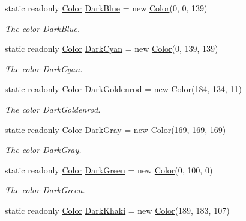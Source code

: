 \begin{DoxyCompactItemize}
static readonly \hyperlink{struct_tri_devs_1_1_tri_engine2_d_1_1_color}{Color} \hyperlink{struct_tri_devs_1_1_tri_engine2_d_1_1_color_af347b38273428c1441418a59a7eda9c7}{Dark\-Blue} = new \hyperlink{struct_tri_devs_1_1_tri_engine2_d_1_1_color}{Color}(0, 0, 139)
\begin{DoxyCompactList}\small\item\em The color Dark\-Blue. \end{DoxyCompactList}\item 
static readonly \hyperlink{struct_tri_devs_1_1_tri_engine2_d_1_1_color}{Color} \hyperlink{struct_tri_devs_1_1_tri_engine2_d_1_1_color_a972ef3b358f0a0bb1f18b26cc158bb0f}{Dark\-Cyan} = new \hyperlink{struct_tri_devs_1_1_tri_engine2_d_1_1_color}{Color}(0, 139, 139)
\begin{DoxyCompactList}\small\item\em The color Dark\-Cyan. \end{DoxyCompactList}\item 
static readonly \hyperlink{struct_tri_devs_1_1_tri_engine2_d_1_1_color}{Color} \hyperlink{struct_tri_devs_1_1_tri_engine2_d_1_1_color_a8e405cf0783424df70d63e1230d3b608}{Dark\-Goldenrod} = new \hyperlink{struct_tri_devs_1_1_tri_engine2_d_1_1_color}{Color}(184, 134, 11)
\begin{DoxyCompactList}\small\item\em The color Dark\-Goldenrod. \end{DoxyCompactList}\item 
static readonly \hyperlink{struct_tri_devs_1_1_tri_engine2_d_1_1_color}{Color} \hyperlink{struct_tri_devs_1_1_tri_engine2_d_1_1_color_a011640bc39f359cafab439d10da5a6ad}{Dark\-Gray} = new \hyperlink{struct_tri_devs_1_1_tri_engine2_d_1_1_color}{Color}(169, 169, 169)
\begin{DoxyCompactList}\small\item\em The color Dark\-Gray. \end{DoxyCompactList}\item 
static readonly \hyperlink{struct_tri_devs_1_1_tri_engine2_d_1_1_color}{Color} \hyperlink{struct_tri_devs_1_1_tri_engine2_d_1_1_color_a70216aff6643befb044853af65fa1280}{Dark\-Green} = new \hyperlink{struct_tri_devs_1_1_tri_engine2_d_1_1_color}{Color}(0, 100, 0)
\begin{DoxyCompactList}\small\item\em The color Dark\-Green. \end{DoxyCompactList}\item 
static readonly \hyperlink{struct_tri_devs_1_1_tri_engine2_d_1_1_color}{Color} \hyperlink{struct_tri_devs_1_1_tri_engine2_d_1_1_color_ae12d4b85870751487169824ff99676bc}{Dark\-Khaki} = new \hyperlink{struct_tri_devs_1_1_tri_engine2_d_1_1_color}{Color}(189, 183, 107)

\end{DoxyCompactItemize}

